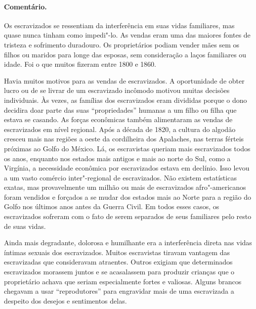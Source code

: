 \paragraph{Comentário.}\quad
{\small
Os escravizados se ressentiam da interferência em suas vidas
familiares, mas quase nunca tinham como impedi"-lo. As vendas eram uma
das maiores fontes de tristeza e sofrimento duradouro. Os proprietários
podiam vender mães sem os filhos ou maridos para longe das esposas, sem
consideração a laços familiares ou idade. Foi o que muitos fizeram entre
1800 e 1860.

Havia muitos motivos para as vendas de escravizados. A oportunidade de
obter lucro ou de se livrar de um escravizado incômodo motivou muitas
decisões individuais. Às vezes, as famílias dos escravizados eram divididas
porque o dono decidira doar parte das suas ``propriedades'' humanas a um
filho ou filha que estava se casando. As forças econômicas também
alimentaram as vendas de escravizados em nível regional. Após a década de
1820, a cultura do algodão cresceu mais nas regiões a oeste da
cordilheira dos Apalaches, nas terras férteis próximas ao Golfo do
México. Lá, os escravistas queriam mais escravizados todos os anos, enquanto
nos estados mais antigos e mais ao norte do Sul, como a Virgínia, a
necessidade econômica por escravizados estava em declínio. Isso levou a um
vasto comércio inter"-regional de escravizados. Não existem estatísticas
exatas, mas provavelmente um milhão ou mais de escravizados afro"-americanos
foram vendidos e forçados a se mudar dos estados mais ao Norte para a
região do Golfo nos últimos anos antes da Guerra Civil. Em todos esses
casos, os escravizados sofreram com o fato de serem separados de seus
familiares pelo resto de suas vidas.

Ainda mais degradante, dolorosa e humilhante era a interferência
direta nas vidas íntimas sexuais dos escravizados. Muitos escravistas
tiravam vantagem das escravizadas que consideravam atraentes. Outros exigiam
que determinados escravizados morassem juntos e se acasalassem para produzir
crianças que o proprietário achava que seriam especialmente fortes e
valiosas. Alguns brancos chegavam a usar ``reprodutores'' para
engravidar mais de uma escravizada a despeito dos desejos e sentimentos
delas.

}
